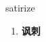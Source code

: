 
\begin{frame}
{\huge satirize}
\begin{center}
\begin{enumerate}\Large
  \item \textbf{讽刺}
\end{enumerate}
\end{center}
\end{frame}
